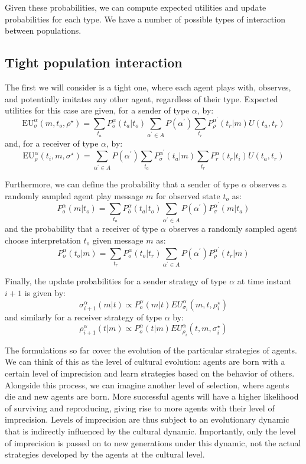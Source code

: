 \documentclass[a4paper]{article}
\begin{document}
Given these probabilities, we can compute expected utilities and update probabilities for each type.
We have a number of possible types of interaction between populations.

\subsection{Tight population interaction}
\label{sec:tight-interaction-model}
The first we will consider is a tight one, where each agent plays with, observes, and potentially imitates any other agent, regardless of their type.
Expected utilities for this case are given, for a sender of type $\alpha$, by:
$$
\text{EU}_{\sigma}^{\alpha}(m,t_{o},\rho^{\star})=\sum_{t_{a}}P_{\bar{o}}^{\alpha}(t_{a}|t_{o})\sum_{\alpha^{\prime}\in A}P(\alpha^{\prime})\sum_{t_{r}}P_{\rho}^{\alpha^{\prime}}(t_{r}|m)U(t_{a},t_{r})
$$
and, for a receiver of type $\alpha$, by:
$$
\text{EU}_{\rho}^{\alpha}(t_{i},m,\sigma^{\star})=\sum_{\alpha^{\prime}\in A}P(\alpha^{\prime})\sum_{t_{a}}P_{\bar{\sigma}}^{\alpha^{\prime}}(t_{a}|m)\sum_{t_{r}}P_{r}^{\alpha}(t_{r}|t_{i})U(t_{a},t_{r})
$$

Furthermore, we can define the probability that a sender of type $\alpha$ observes a randomly sampled agent play message $m$ for observed state $t_o$ as:
$$
P_{o}^{\alpha}(m|t_{o})=\sum_{t_{a}}P_{\bar{o}}^{\alpha}(t_{a}|t_{o})\sum_{\alpha^{\prime}\in A}P(\alpha^{\prime})P_{\sigma}^{\alpha^{\prime}}(m|t_{a})
$$
and the probability that a receiver of type $\alpha$ observes a randomly sampled agent choose interpretation $t_o$ given message $m$ as:
$$
P_{o}^{\alpha}(t_{o}|m)=\sum_{t_{r}}P_{o}^{\alpha}(t_{o}|t_{r})\sum_{\alpha^{\prime}\in A}P(\alpha^{\prime})P_{\rho}^{\alpha^{\prime}}(t_{r}|m)
$$

Finally, the update probabilities for a sender strategy of type $\alpha$ at time instant $i+1$ is given by:
$$
\sigma_{i+1}^{\alpha}(m|t) \propto P_{o}^{\alpha}(m|t)EU_{\sigma_{i}}^{\alpha}(m,t,\rho_{i}^{\star})
$$
and similarly for a receiver strategy of type $\alpha$ by:
$$
\rho_{i+1}^{\alpha}(t|m) \propto P_{o}^{\alpha}(t|m)EU_{\rho_{i}}^{\alpha}(t,m,\sigma_{i}^{\star})
$$

The formulations so far cover the evolution of the particular strategies of agents.
We can think of this as the level of cultural evolution: agents are born with a certain level of imprecision and learn strategies based on the behavior of others.
Alongside this process, we can imagine another level of selection, where agents die and new agents are born.
More successful agents will have a higher likelihood of surviving and reproducing, giving rise to more agents with their level of imprecision.
Levels of imprecision are thus subject to an evolutionary dynamic that is indirectly influenced by the cultural dynamic.
Importantly, only the level of imprecision is passed on to new generations under this dynamic, not the actual strategies developed by the agents at the cultural level.
\end{document}
